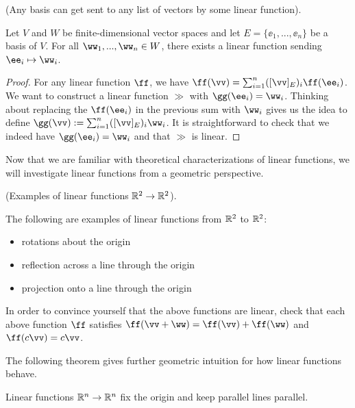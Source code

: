 \begin{theorem}
\label{ch::lin_alg::thm::basis_sent_to_any_ordered_list}
    (Any basis can get sent to any list of vectors by some linear function).
    
    Let $V$ and $W$ be finite-dimensional vector spaces and let $E = \{\ee_1, ..., \ee_n\}$ be a basis of $V$. For all $\ww_1, ..., \ww_n \in W$, there exists a linear function sending $\ee_i \mapsto \ww_i$.
\end{theorem}

\begin{proof}
    For any linear function $\ff$, we have $\ff(\vv) = \sum_{i = 1}^n ([\vv]_E)_i \ff(\ee_i)$. We want to construct a linear function $\gg$ with $\gg(\ee_i) = \ww_i$. Thinking about replacing the $\ff(\ee_i)$ in the previous sum with $\ww_i$ gives us the idea to define $\gg(\vv) := \sum_{i = 1}^n ([\vv]_E)_i \ww_i$. It is straightforward to check that we indeed have $\gg(\ee_i) = \ww_i$ and that $\gg$ is linear.
\end{proof}

Now that we are familiar with theoretical characterizations of linear functions, we will investigate linear functions from a geometric perspective.

\begin{remark}
    (Examples of linear functions $\mathbb{R}^2 \rightarrow \mathbb{R}^2$).
    
    The following are examples of linear functions from $\mathbb{R}^2$ to $\mathbb{R}^2$:
    
    \begin{itemize}
        \item rotations about the origin
        \item reflection across a line through the origin
        \item projection onto a line through the origin
    \end{itemize}
    
    In order to convince yourself that the above functions are linear, check that each above function $\ff$ satisfies $\ff(\vv + \ww) = \ff(\vv) + \ff(\ww)$ and $\ff(c \vv) = c \vv$.
\end{remark}

The following theorem gives further geometric intuition for how linear functions behave.

\begin{theorem}
    Linear functions $\mathbb{R}^n \rightarrow \mathbb{R}^n$ fix the origin and keep parallel lines parallel.
\end{theorem}

